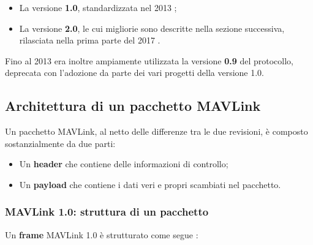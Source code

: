 \documentclass[a4paper, 12pt, oneside]{article}
\begin{document}
\begin{itemize}
    \item La versione \textbf{1.0}, standardizzata nel 2013 \cite{mavlink-versions};
    \item La versione \textbf{2.0}, le cui migliorie sono descritte nella sezione successiva, rilasciata nella prima parte del 2017 \cite{mavlink-2}.
\end{itemize}

Fino al 2013 era inoltre ampiamente utilizzata la versione \textbf{0.9} del protocollo, deprecata con l'adozione da parte dei vari progetti della versione 1.0.

\newpage
\subsection{Architettura di un pacchetto MAVLink}

Un pacchetto MAVLink, al netto delle differenze tra le due revisioni, è composto sostanzialmente da due parti:

\begin{itemize}
    \item Un \textbf{header} che contiene delle informazioni di controllo;
    \item Un \textbf{payload} che contiene i dati veri e propri scambiati nel pacchetto.
\end{itemize}

\subsubsection{MAVLink 1.0: struttura di un pacchetto}
Un \textbf{frame} MAVLink 1.0 è strutturato come segue \cite{mavlink-1-packet}:
\end{document}

